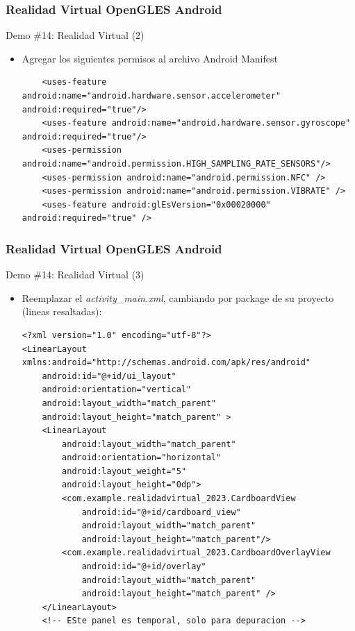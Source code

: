 \documentclass[aspectratio=169,compress]{beamer}
\begin{document}
\begin{frame}[fragile]
\frametitle{Realidad Virtual OpenGLES Android}
\begin{block}{Demo \#14: Realidad Virtual (2)}
\begin{itemize}
\item Agregar los siguientes permisos al archivo Android Manifest
\begin{verbatim}
    <uses-feature android:name="android.hardware.sensor.accelerometer" android:required="true"/>
    <uses-feature android:name="android.hardware.sensor.gyroscope" android:required="true"/>
    <uses-permission android:name="android.permission.HIGH_SAMPLING_RATE_SENSORS"/>
    <uses-permission android:name="android.permission.NFC" />
    <uses-permission android:name="android.permission.VIBRATE" />
    <uses-feature android:glEsVersion="0x00020000" android:required="true" />
\end{verbatim}
\end{itemize}
\end{block}
\end{frame}

\begin{frame}[fragile]
\frametitle{Realidad Virtual OpenGLES Android}
\begin{block}{Demo \#14: Realidad Virtual (3)}
\begin{itemize}
\item Reemplazar el \textit{activity\_main.xml}, cambiando por package de su proyecto (lineas resaltadas):
\begin{verbatim}
<?xml version="1.0" encoding="utf-8"?>
<LinearLayout xmlns:android="http://schemas.android.com/apk/res/android"
    android:id="@+id/ui_layout"
    android:orientation="vertical"
    android:layout_width="match_parent"
    android:layout_height="match_parent" >
    <LinearLayout
        android:layout_width="match_parent"
        android:orientation="horizontal"
        android:layout_weight="5"
        android:layout_height="0dp">
        <com.example.realidadvirtual_2023.CardboardView
            android:id="@+id/cardboard_view"
            android:layout_width="match_parent"
            android:layout_height="match_parent"/>
        <com.example.realidadvirtual_2023.CardboardOverlayView
            android:id="@+id/overlay"
            android:layout_width="match_parent"
            android:layout_height="match_parent" />
    </LinearLayout>
    <!-- ESte panel es temporal, solo para depuracion -->
\end{verbatim}
\end{itemize}
\end{block}
\end{frame}
\end{document}
